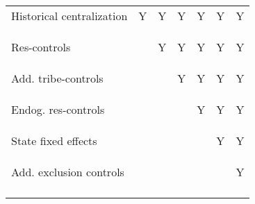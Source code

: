 \begin{center}
\begin{tabular}{lcccccc}
\noalign{\smallskip}Historical centralization & Y & Y & Y & Y & Y & Y\\
Res-controls & \begin{footnotesize}\end{footnotesize} & \begin{footnotesize}Y\end{footnotesize} & \begin{footnotesize}Y\end{footnotesize} & \begin{footnotesize}Y\end{footnotesize} & \begin{footnotesize}Y\end{footnotesize} & \begin{footnotesize}Y\end{footnotesize}\\
Add. tribe-controls &  &  & Y & Y & Y & Y\\
Endog. res-controls & \begin{footnotesize}\end{footnotesize} & \begin{footnotesize}\end{footnotesize} & \begin{footnotesize}\end{footnotesize} & \begin{footnotesize}Y\end{footnotesize} & \begin{footnotesize}Y\end{footnotesize} & \begin{footnotesize}Y\end{footnotesize}\\
State fixed effects &  &  &  &  & Y & Y\\
Add. exclusion controls & \begin{footnotesize}\end{footnotesize} & \begin{footnotesize}\end{footnotesize} & \begin{footnotesize}\end{footnotesize} & \begin{footnotesize}\end{footnotesize} & \begin{footnotesize}\end{footnotesize} & \begin{footnotesize}Y\end{footnotesize}\\
\noalign{\smallskip}\hline\end{tabular}\\
\end{center}
